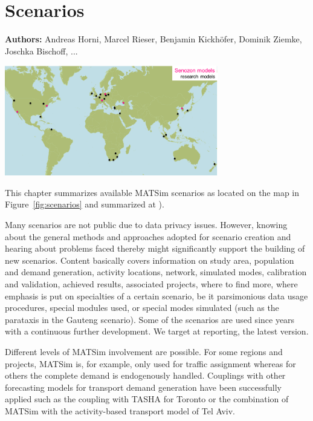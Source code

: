 \chapter{Scenarios}
\label{ch:scenarios}

\hfill \textbf{Authors:} Andreas Horni, Marcel Rieser, Benjamin Kickhöfer, Dominik Ziemke, Joschka Bischoff, ...

\begin{center} \includegraphics[width=0.7\textwidth, angle=0]{using/figures/scenarios} \end{center}

This chapter summarizes available MATSim scenarios as located on the map in Figure~\ref{fig:scenarios} and summarized at \citet[][]{MATSIM-T-Scenarios_Webpage_2014}).

Many scenarios are not public due to data privacy issues. However, knowing about the general methods and approaches adopted for scenario creation and hearing about problems faced thereby might significantly support the building of new scenarios. Content basically covers information on study area, population and demand generation, activity locations, network, simulated modes, calibration and validation, achieved results, associated projects, where to find more, where emphasis is put on specialties of a certain scenario, be it parsimonious data usage procedures, special modules used, or special modes simulated (such as the parataxis in the Gauteng scenario). Some of the scenarios are used since years with a continuous further development. We target at reporting, the latest version. 

Different levels of MATSim involvement are possible. For some regions and projects, MATSim is, for example, only used for traffic assignment whereas for others the complete demand is endogenously handled. Couplings with other forecasting models for transport demand generation have been successfully applied such as the coupling with TASHA for Toronto or the combination of MATSim with the activity-based transport model of Tel Aviv.

